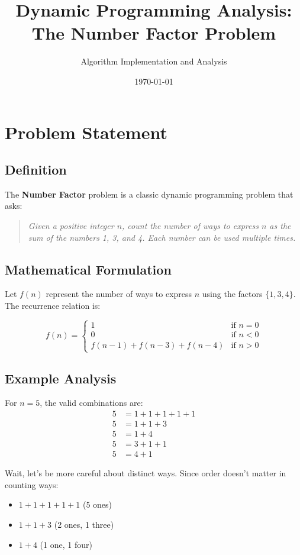 \documentclass[12pt,a4paper]{article}
\title{\textbf{Dynamic Programming Analysis: \\The Number Factor Problem}}
\author{Algorithm Implementation and Analysis}
\date{\today}
\begin{document}
\maketitle

\tableofcontents
\newpage

\section{Problem Statement}

\subsection{Definition}
The \textbf{Number Factor} problem is a classic dynamic programming problem that asks:

\begin{quote}
\textit{Given a positive integer $n$, count the number of ways to express $n$ as the sum of the numbers 1, 3, and 4. Each number can be used multiple times.}
\end{quote}

\subsection{Mathematical Formulation}
Let $f(n)$ represent the number of ways to express $n$ using the factors $\{1, 3, 4\}$. The recurrence relation is:

\begin{equation}
f(n) = \begin{cases}
1 & \text{if } n = 0 \\
0 & \text{if } n < 0 \\
f(n-1) + f(n-3) + f(n-4) & \text{if } n > 0
\end{cases}
\end{equation}

\subsection{Example Analysis}
For $n = 5$, the valid combinations are:
\begin{align}
5 &= 1 + 1 + 1 + 1 + 1 \nonumber \\
5 &= 1 + 1 + 3 \nonumber \\
5 &= 1 + 4 \nonumber \\
5 &= 3 + 1 + 1 \nonumber \\
5 &= 4 + 1 \nonumber
\end{align}

Wait, let's be more careful about distinct ways. Since order doesn't matter in counting ways:
\begin{itemize}
\item $1+1+1+1+1$ (5 ones)
\item $1+1+3$ (2 ones, 1 three) 
\item $1+4$ (1 one, 1 four)
\end{itemize}
\end{document}
